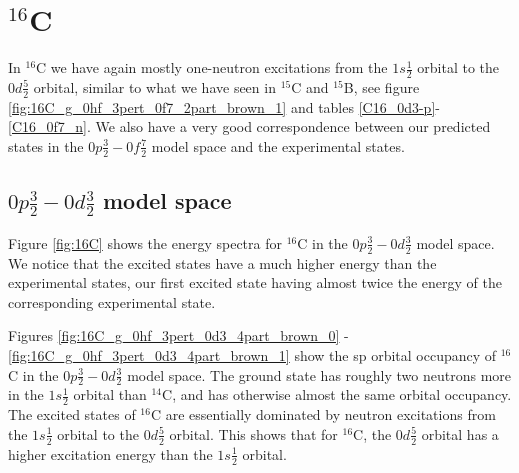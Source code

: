 \section{$^{16}$C}

In $^{16}$C we have again mostly one-neutron excitations from the $1s\frac12$
orbital to the $0d\frac52$ orbital, similar to what we have seen in $^{15}$C and $^{15}$B, see
figure \ref{fig:16C_g_0hf_3pert_0f7_2part_brown_1} and tables
\ref{C16_0d3-p}-\ref{C16_0f7_n}. We also have a very good correspondence
between our predicted states in the $0p\frac32-0f\frac72$ model space and the
experimental states.

\subsection{$0p\frac32-0d\frac32$ model space}

Figure \ref{fig:16C} shows the energy spectra for $^{16}$C in the
$0p\frac32-0d\frac32$ model space. We notice that the excited states have a
much higher energy than the experimental states, our first excited state having
almost twice the energy of the corresponding experimental state.

Figures \ref{fig:16C_g_0hf_3pert_0d3_4part_brown_0} -
\ref{fig:16C_g_0hf_3pert_0d3_4part_brown_1} show the sp orbital occupancy of
$^{16}$C in the $0p\frac32-0d\frac32$ model space. The ground state has
roughly two neutrons more in the $1s\frac12$ orbital than $^{14}$C, and has
otherwise almost the same orbital occupancy. The excited states of $^{16}$C
are essentially dominated by neutron excitations from the $1s\frac12$ orbital to the
$0d\frac52$ orbital. This shows that for $^{16}$C, the $0d\frac52$ orbital has
a higher excitation energy than the $1s\frac12$ orbital.


